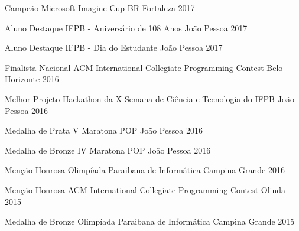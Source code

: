 \begin{cvhonors}

  \cvhonor
    {Campeão}
    {Microsoft Imagine Cup BR}
    {Fortaleza}
    {2017} %

  \cvhonor
    {Aluno Destaque}
    {IFPB - Aniversário de 108 Anos}
    {João Pessoa}
    {2017} %

  \cvhonor
    {Aluno Destaque}
    {IFPB - Dia do Estudante}
    {João Pessoa}
    {2017} %

  \cvhonor
    {Finalista Nacional}
    {ACM International Collegiate Programming Contest}
    {Belo Horizonte}
    {2016} %

  \cvhonor
    {Melhor Projeto}
    {Hackathon da X Semana de Ciência e Tecnologia do IFPB}
    {João Pessoa}
    {2016} %

  \cvhonor
    {Medalha de Prata}
    {V Maratona POP}
    {João Pessoa}
    {2016} %

  \cvhonor
    {Medalha de Bronze}
    {IV Maratona POP}
    {João Pessoa}
    {2016} %

  \cvhonor
    {Menção Honrosa}
    {Olimpíada Paraibana de Informática}
    {Campina Grande}
    {2016} %
%

  \cvhonor
    {Menção Honrosa}
    {ACM International Collegiate Programming Contest}
    {Olinda}
    {2015} %

  \cvhonor
    {Medalha de Bronze}
    {Olimpíada Paraibana de Informática}
    {Campina Grande}
    {2015} %
%


\end{cvhonors}
